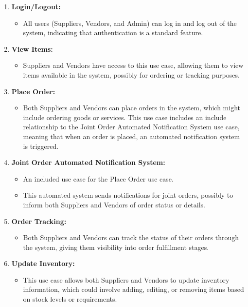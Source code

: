 \begin{enumerate}
    \item \textbf{Login/Logout:}
          \begin{itemize}
              \item All users (Suppliers, Vendors, and Admin) can log in and log out of the system, indicating that authentication is a standard feature.
          \end{itemize}

    \item \textbf{View Items:}
          \begin{itemize}
              \item Suppliers and Vendors have access to this use case, allowing them to view items available in the system, possibly for ordering or tracking purposes.
          \end{itemize}

    \item \textbf{Place Order:}
          \begin{itemize}
              \item Both Suppliers and Vendors can place orders in the system, which might include ordering goods or services. This use case includes an include relationship to the Joint Order Automated Notification System use case, meaning that when an order is placed, an automated notification system is triggered.
          \end{itemize}

    \item \textbf{Joint Order Automated Notification System:}
          \begin{itemize}
              \item An included use case for the Place Order use case.
              \item This automated system sends notifications for joint orders, possibly to inform both Suppliers and Vendors of order status or details.
          \end{itemize}

    \item \textbf{Order Tracking:}
          \begin{itemize}
              \item Both Suppliers and Vendors can track the status of their orders through the system, giving them visibility into order fulfillment stages.
          \end{itemize}

    \item \textbf{Update Inventory:}
          \begin{itemize}
              \item This use case allows both Suppliers and Vendors to update inventory information, which could involve adding, editing, or removing items based on stock levels or requirements.
          \end{itemize}


\end{enumerate}

